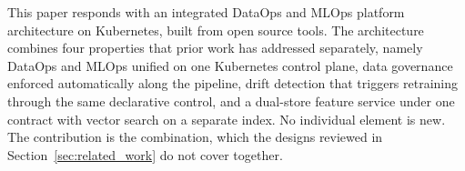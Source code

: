 This paper responds with an integrated DataOps and MLOps platform architecture on Kubernetes, built from open source tools. The architecture combines four properties that prior work has addressed separately, namely DataOps and MLOps unified on one Kubernetes control plane, data governance enforced automatically along the pipeline, drift detection that triggers retraining through the same declarative control, and a dual-store feature service under one contract with vector search on a separate index. No individual element is new. The contribution is the combination, which the designs reviewed in Section~\ref{sec:related_work} do not cover together.
